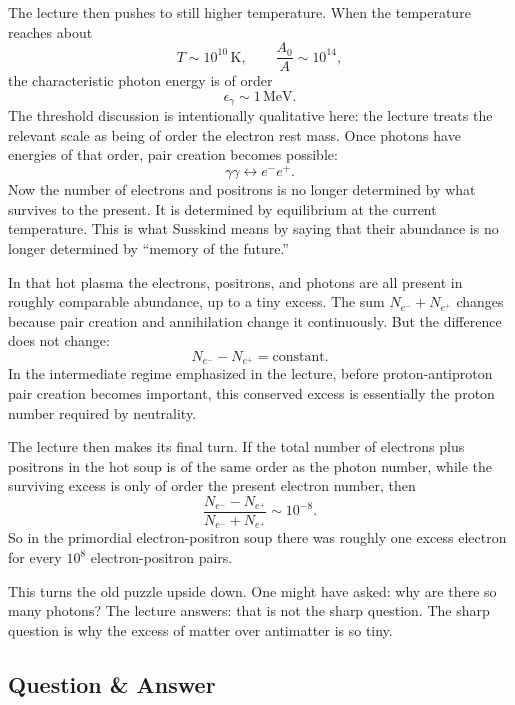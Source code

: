 The lecture then pushes to still higher temperature. When the temperature reaches about
\begin{equation}
T \sim 10^{10}\,\mathrm{K},
\qquad
\frac{A_0}{A} \sim 10^{14},
\end{equation}
the characteristic photon energy is of order
\begin{equation}
\epsilon_\gamma \sim 1\,\mathrm{MeV}.
\end{equation}
The threshold discussion is intentionally qualitative here: the lecture treats the relevant scale as being of order the electron rest mass. Once photons have energies of that order, pair creation becomes possible:
\begin{equation}
\gamma\gamma \leftrightarrow e^- e^+.
\end{equation}
Now the number of electrons and positrons is no longer determined by what survives to the present. It is determined by equilibrium at the current temperature. This is what Susskind means by saying that their abundance is no longer determined by ``memory of the future.''

In that hot plasma the electrons, positrons, and photons are all present in roughly comparable abundance, up to a tiny excess. The sum \(N_{e^-}+N_{e^+}\) changes because pair creation and annihilation change it continuously. But the difference does not change:
\begin{equation}
N_{e^-}-N_{e^+}=\mathrm{constant}.
\end{equation}
In the intermediate regime emphasized in the lecture, before proton-antiproton pair creation becomes important, this conserved excess is essentially the proton number required by neutrality.

The lecture then makes its final turn. If the total number of electrons plus positrons in the hot soup is of the same order as the photon number, while the surviving excess is only of order the present electron number, then
\begin{equation}
\frac{N_{e^-}-N_{e^+}}{N_{e^-}+N_{e^+}} \sim 10^{-8}.
\end{equation}
So in the primordial electron-positron soup there was roughly one excess electron for every \(10^8\) electron-positron pairs.

This turns the old puzzle upside down. One might have asked: why are there so many photons? The lecture answers: that is not the sharp question. The sharp question is why the excess of matter over antimatter is so tiny.

\subsection{Question \& Answer}

